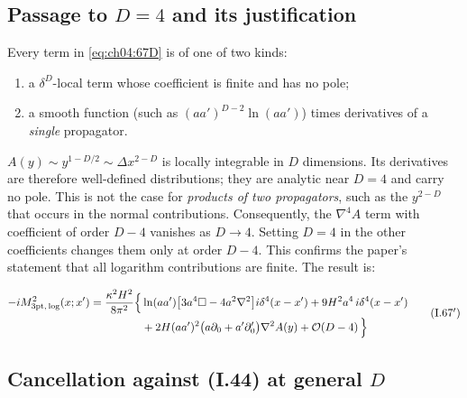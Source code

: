 \subsection{Passage to \texorpdfstring{$D=4$}{D=4} and its justification \texorpdfstring{\tA}{}}
\label{sec:ch04:Dto4}

Every term in \eqref{eq:ch04:67D} is of one of two kinds:
\begin{enumerate}[leftmargin=1.5em,itemsep=1pt]
\item a $\delta^D$-local term whose coefficient is finite and has no pole;
\item a smooth function (such as $(aa')^{D-2}\ln(aa')$) times derivatives of a \emph{single} propagator.
\end{enumerate}
$A(y)\sim y^{1-D/2}\sim\Delta x^{2-D}$ is locally integrable in $D$ dimensions.
Its derivatives are therefore well-defined distributions; they are analytic near $D=4$ and carry no pole.
This is not the case for \emph{products of two propagators}, such as the $y^{2-D}$ that occurs in the normal contributions.
Consequently, the $\nabla^4A$ term with coefficient of order $D-4$ vanishes as $D\to4$.
Setting $D=4$ in the other coefficients changes them only at order $D-4$.
This confirms the paper's statement that all logarithm contributions are finite. The result is:
\begin{resultbox}
\begin{equation*}
\begin{aligned}
-iM^2_{\rm 3pt,\,log}(x;x')=\frac{\kappa^2H^2}{8\pi^2}\Big\{&\ln(aa')\big[3a^4\square-4a^2\nabla^2\big]i\delta^4(x-x')+9H^2a^4\,i\delta^4(x-x')\\
&+2H(aa')^2\big(a\partial_0+a'\partial'_0\big)\nabla^2A(y)+\mathcal{O}\!\left(D-4\right)\Big\}
\end{aligned}
\tag{I.67$'$}\label{eq:ch04:67}
\end{equation*}
\end{resultbox}

\subsection{Cancellation against (I.44) at general \texorpdfstring{$D$}{D} \texorpdfstring{\tD}{}}
\label{sec:ch04:cancel}

